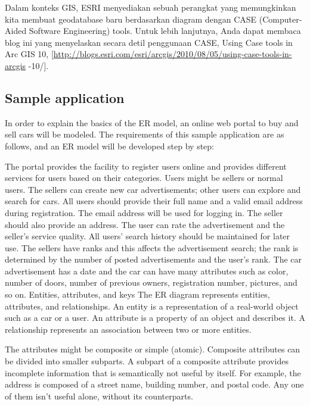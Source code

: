 \documentclass[]{book}
\begin{document}
Dalam konteks GIS, ESRI menyediakan sebuah perangkat yang memungkinkan kita membuat geodatabase baru berdasarkan diagram dengan CASE (Computer-Aided Software Engineering) tools. Untuk lebih lanjutnya, Anda dapat membaca blog ini yang menyelaskan secara detil penggunaan CASE, Using Case tools in Arc GIS 10, {[}\url{http://blogs.esri.com/esri/arcgis/2010/08/05/using-case-tools-in-arcgis} -10/{]}.

\hypertarget{sample-application}{%
\subsection{Sample application}\label{sample-application}}

In order to explain the basics of the ER model, an online web portal to buy and sell cars will be modeled. The requirements of this sample application are as follows, and an ER model will be developed step by step:

The portal provides the facility to register users online and provides different services for users based on their categories.
Users might be sellers or normal users. The sellers can create new car advertisements; other users can explore and search for cars.
All users should provide their full name and a valid email address during registration. The email address will be used for logging in.
The seller should also provide an address.
The user can rate the advertisement and the seller's service quality.
All users' search history should be maintained for later use.
The sellers have ranks and this affects the advertisement search; the rank is determined by the number of posted advertisements and the user's rank.
The car advertisement has a date and the car can have many attributes such as color, number of doors, number of previous owners, registration number, pictures, and so on.
Entities, attributes, and keys
The ER diagram represents entities, attributes, and relationships. An entity is a representation of a real-world object such as a car or a user. An attribute is a property of an object and describes it. A relationship represents an association between two or more entities.

The attributes might be composite or simple (atomic). Composite attributes can be divided into smaller subparts. A subpart of a composite attribute provides incomplete information that is semantically not useful by itself. For example, the address is composed of a street name, building number, and postal code. Any one of them isn't useful alone, without its counterparts.
\end{document}

